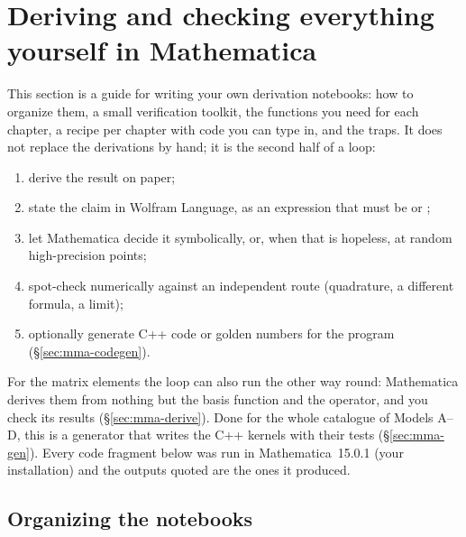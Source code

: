 \documentclass[11pt,a4paper]{article}
\numberwithin{equation}{section}
\theoremstyle{definition}
\theoremstyle{plain}
\theoremstyle{remark}
\numberwithin{algorithm}{section}
\begin{document}
\section{Deriving and checking everything yourself in Mathematica}\label{sec:mathematica}

This section is a guide for writing your own derivation notebooks: how to organize them, a small verification toolkit, the functions you need for each chapter, a recipe per chapter with code you can type in, and the traps. It does not replace the derivations by hand; it is the second half of a loop:
\begin{enumerate}[leftmargin=1.5em,itemsep=2pt]
\item derive the result on paper;
\item state the claim in Wolfram Language, as an expression that must be  or ;
\item let Mathematica decide it symbolically, or, when that is hopeless, at random high-precision points;
\item spot-check numerically against an independent route (quadrature, a different formula, a limit);
\item optionally generate C++ code or golden numbers for the program (\S\ref{sec:mma-codegen}).
\end{enumerate}
For the matrix elements the loop can also run the other way round: Mathematica derives them from nothing but the basis function and the operator, and you check its results (\S\ref{sec:mma-derive}). Done for the whole catalogue of Models A--D, this is a generator that writes the C++ kernels with their tests (\S\ref{sec:mma-gen}).
Every code fragment below was run in Mathematica~15.0.1 (your installation) and the outputs quoted are the ones it produced.

\subsection{Organizing the notebooks}\label{sec:mma-org}
\end{document}
